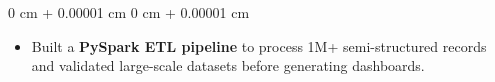 \documentclass[10pt, letterpaper]{article}
\newenvironment{highlights}{
    \begin{itemize}[
        topsep=0.04 cm,
        parsep=0.02cm,
        partopsep=0pt,
        itemsep=0pt,
        leftmargin=0 cm + 10pt
    ]
}{
    \end{itemize}
} %
\newcommand{\stronglink}[2]{%
    \href{#1}{\textbf{\uline{\textcolor{blue}{#2}}}}%
}
\newenvironment{onecolentry}{
    \begin{adjustwidth}{
        0 cm + 0.00001 cm
    }{
        0 cm + 0.00001 cm
    }
}{
    \end{adjustwidth}
} %
\newenvironment{twocolentry}[2][]{
    \onecolentry
    \def\secondColumn{#2}
    \setcolumnwidth{\fill, 3.8 cm}
    \begin{paracol}{2}
}{
    \switchcolumn \raggedleft \secondColumn
    \end{paracol}
    \endonecolentry
} %
\begin{document}
    \begin{onecolentry}
        \begin{highlights}
            \item Built a \textbf{PySpark ETL pipeline} to process 1M+ semi-structured records and validated large-scale datasets before generating dashboards.
        \end{highlights}
    \end{onecolentry}

\end{document}
